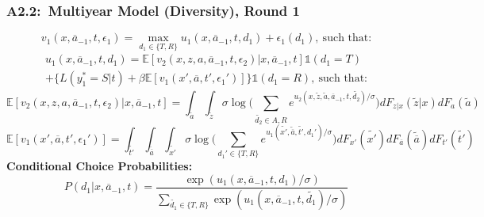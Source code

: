 \documentclass[12pt, aspectratio=169]{beamer}
\begin{document}
\begin{frame}[label=mmdr1]
\frametitle{A2.2:\ Multiyear Model (Diversity), Round 1}
\vspace{-12.5pt}
\small
\begin{equation*}
v_1(x,\overline{a}_{-1},t,\epsilon_1) = \max_{d_1\in\{T,R\}}u_1(x,\overline{a}_{-1},t,d_1)+\epsilon_1(d_1), \: \text{such that:}
\end{equation*}
\begin{multline*}
u_1(x,\overline{a}_{-1},t,d_1) = \mathbb{E}[v_2(x,z,a,\overline{a}_{-1},t,\epsilon_2)|x,\overline{a}_{-1},t]\mathds{1}(d_1=T) \\
+\{L(y_1^*=S|t)+\beta\mathbb{E}[v_1(x',\overline{a},t',\epsilon_1')]\}\mathds{1}(d_1=R), \: \text{such that:}
\end{multline*}
\begin{equation*}
\mathbb{E}[v_2(x,z,a,\overline{a}_{-1},t,\epsilon_2)|x,\overline{a}_{-1},t] = \int_{\widetilde a}\int_{\widetilde z}\sigma\log\bigg(\sum_{\widetilde{d_2}\in{A,R}}e^{u_2(x,\widetilde z,\widetilde a,\overline{a}_{-1},t,\widetilde{d_2})/\sigma}\bigg)dF_{z|x}(\widetilde z|x)dF_a(\widetilde a)
\end{equation*}
\begin{equation*}
\mathbb{E}[v_1(x',\overline{a},t',\epsilon_1')] = \int_{\widetilde{t'}}\int_{\widetilde{\overline{a}}}\int_{\widetilde{x'}}\sigma\log\bigg(\sum_{d_1'\in\{T,R\}}e^{u_1(\widetilde{x'},\widetilde{\overline{a}},\widetilde{t'},d_1')/\sigma}\bigg)dF_{x'}(\widetilde{x'})dF_{\overline{a}}(\widetilde{\overline{a}})dF_{t'}(\widetilde{t'})
\end{equation*}
\normalsize
\textbf{Conditional Choice Probabilities:}
\small
\begin{equation*}
P(d_1|x,\overline{a}_{-1},t) = \frac{\exp(u_1(x,\overline{a}_{-1},t,d_1)/\sigma)}{\sum_{\widetilde{d_1}\in\{T,R\}}\exp(u_1(x,\overline{a}_{-1},t,\widetilde{d_1})/\sigma)}
\end{equation*}
\hyperlink{conc}{}
\end{frame}
\end{document}
